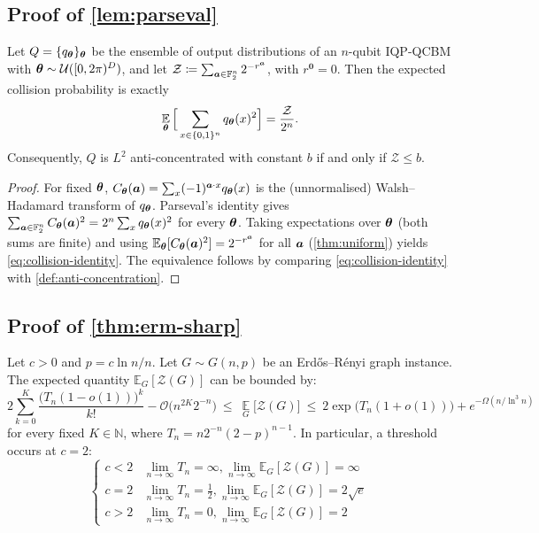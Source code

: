 \documentclass{article}
\theoremstyle{plain}
\theoremstyle{definition}
\theoremstyle{remark}
\begin{document}
\subsection{Proof of \cref{lem:parseval}}
Let $Q=\{q_{\bm{\theta}}\}_{\bm{\theta}}$ be the ensemble of output distributions of an
$n$-qubit IQP-QCBM with ${\bm{\theta}}\sim\mathcal U([0,2\pi)^D)$, and let
$\mathcal Z \coloneqq \sum_{{\bm{a}}\in\mathbb{F}_2^n} 2^{-r^{\bm{a}}}$, with $r^{\mathbf 0}=0$.
Then the expected collision probability is exactly
\begin{equation}
\operatorname*{\mathbb{E}}_{{\bm{\theta}}}\Big[\sum_{x\in\{0,1\}^n} q_{\bm{\theta}}(x)^2\Big]
= \frac{\mathcal Z}{2^n}.
\end{equation}
Consequently, $Q$ is $L^2$ anti-concentrated with constant $b$ if and only if
$\mathcal Z\le b$. 

\begin{proof}
For fixed ${\bm{\theta}}$, $C_{\bm{\theta}}({\bm{a}})=\sum_{x}(-1)^{{\bm{a}}\cdot x}q_{\bm{\theta}}(x)$ is the
(unnormalised) Walsh--Hadamard transform of $q_{\bm{\theta}}$. Parseval's identity gives
$\sum_{{\bm{a}}\in\mathbb{F}_2^n} C_{\bm{\theta}}({\bm{a}})^2 = 2^n\sum_x q_{\bm{\theta}}(x)^2$ for every
${\bm{\theta}}$. Taking expectations over ${\bm{\theta}}$ (both sums are finite) and using
$\operatorname*{\mathbb{E}}_{\bm{\theta}}[C_{\bm{\theta}}({\bm{a}})^2]=2^{-r^{\bm{a}}}$ for all ${\bm{a}}$
(\cref{thm:uniform}) yields \cref{eq:collision-identity}. The equivalence follows by
comparing \cref{eq:collision-identity} with \cref{def:anti-concentration}.
\end{proof}

\subsection{Proof of \cref{thm:erm-sharp}}
\label{app:er-merged}
Let $c>0$ and $p=c\ln n/n$. Let $G\sim G(n,p)$ be an Erd\H{o}s--R\'enyi graph instance. The expected quantity $\mathbb{E}_G[\mathcal Z(G)]$ can be bounded by:
\begin{equation}
2\sum_{k=0}^{K}\frac{\big(T_n(1-o(1))\big)^k}{k!}-\mathcal O\big(n^{2K}2^{-n}\big)\ \le\ \operatorname*{\mathbb{E}}_G\big[\mathcal Z(G)\big]\ \le\ 2\exp\big(T_n(1+o(1))\big)+e^{-\Omega(n/\ln^3n)}
\end{equation}
for every fixed $K\in\mathbb N$, where $T_n=n2^{-n}(2-p)^{n-1}$. In particular, a threshold occurs at $c=2$:
\begin{equation}
    \begin{cases}
    c<2 & \lim\limits_{n\to \infty} T_n = \infty, \lim\limits_{n\to \infty}\mathbb{E}_G[\mathcal Z(G)] = \infty \\
    c=2 & \lim\limits_{n\to \infty}T_n = \frac{1}{2}, \lim\limits_{n\to \infty}\mathbb{E}_G[\mathcal Z(G)] = 2\sqrt{e}\\
    c>2 & \lim\limits_{n\to \infty}T_n = 0, \lim\limits_{n\to \infty}\mathbb{E}_G[\mathcal Z(G)] = 2 
\end{cases}
\end{equation}
\end{document}
